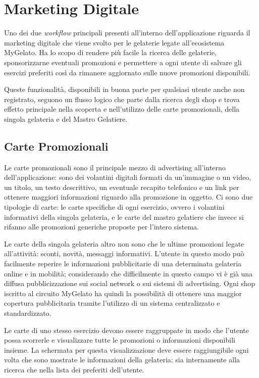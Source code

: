 \section{Marketing Digitale}

Uno dei due \emph{workflow} principali presenti all'interno dell'applicazione
riguarda il marketing digitale che viene svolto per le gelaterie legate
all'ecosistema MyGelato. Ha lo scopo di rendere più facile la ricerca
delle gelaterie, sponsorizzarne eventuali promozioni e permettere
a ogni utente di salvare gli esercizi preferiti così da rimanere aggiornato
sulle nuove promozioni disponibili.

Queste funzionalità, disponibili in buona parte per qualsiasi utente
anche non registrato, seguono un flusso logico che parte dalla ricerca
degli shop e trova effetto principale nella scoperta e nell'utilizzo
delle carte promozionali, della singola gelateria e del Mastro Gelatiere.

\subsection{Carte Promozionali}

Le carte promozionali sono il principale mezzo di advertising all'interno
dell'applicazione: sono dei volantini digitali formati da un'immagine
o un video, un titolo, un testo descrittivo, un eventuale recapito
telefonico e un link per ottenere maggiori informazioni riguardo alla
promozione in oggetto. Ci sono due tipologie di carte: le carte specifiche
di ogni esercizio, ovvero i volantini informativi della singola gelateria,
e le carte del mastro gelatiere che invece si rifanno alle promozioni
generiche proposte per l'intero sistema.\bigskip{}

Le carte della singola gelateria altro non sono che le ultime promozioni
legate all'attività: sconti, novità, messaggi informativi. L'utente
in questo modo può facilmente reperire le informazioni pubblicitarie
di una determinata gelateria online e in mobilità; considerando che
difficilmente in questo campo vi è già una diffusa pubblicizzazione
sui social network o sui sistemi di advertising. Ogni shop iscritto
al circuito MyGelato ha quindi la possibilità di ottenere una maggior
copertura pubblicitaria tramite l'utilizzo di un sistema centralizzato
e standardizzato.

Le carte di uno stesso esercizio devono essere raggruppate in modo
che l'utente possa scorrerle e visualizzare tutte le promozioni o
informazioni disponibili insieme. La schermata per questa visualizzazione
deve essere raggiungibile ogni volta che sono mostrate le informazioni
della gelateria: sia internamente alla ricerca che nella lista dei
preferiti dell'utente.\bigskip{}

